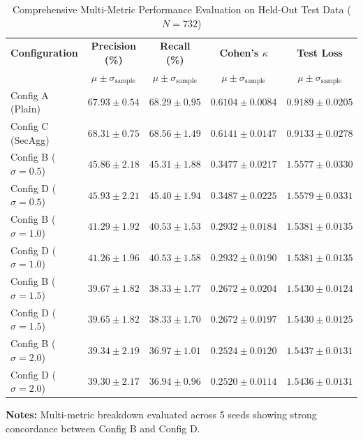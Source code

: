\documentclass[journal,twocolumn,10pt]{IEEEtran}
\begin{document}
\begin{table}[t]
\caption{Comprehensive Multi-Metric Performance Evaluation on Held-Out Test Data ($N = 732$)}
\label{tab:multi_metric}
\centering
\scriptsize
\begin{tabular}{lcccc}
\toprule
\textbf{Configuration} & \textbf{Precision (\%)} & \textbf{Recall (\%)} & \textbf{Cohen's $\kappa$} & \textbf{Test Loss} \\
& $\mu \pm \sigma_{\text{sample}}$ & $\mu \pm \sigma_{\text{sample}}$ & $\mu \pm \sigma_{\text{sample}}$ & $\mu \pm \sigma_{\text{sample}}$ \\
\midrule
Config A (Plain) & $67.93 \pm 0.54$ & $68.29 \pm 0.95$ & $0.6104 \pm 0.0084$ & $0.9189 \pm 0.0205$ \\
Config C (SecAgg) & $68.31 \pm 0.75$ & $68.56 \pm 1.49$ & $0.6141 \pm 0.0147$ & $0.9133 \pm 0.0278$ \\
Config B ($\sigma=0.5$) & $45.86 \pm 2.18$ & $45.31 \pm 1.88$ & $0.3477 \pm 0.0217$ & $1.5577 \pm 0.0330$ \\
Config D ($\sigma=0.5$) & $45.93 \pm 2.21$ & $45.40 \pm 1.94$ & $0.3487 \pm 0.0225$ & $1.5579 \pm 0.0331$ \\
Config B ($\sigma=1.0$) & $41.29 \pm 1.92$ & $40.53 \pm 1.53$ & $0.2932 \pm 0.0184$ & $1.5381 \pm 0.0135$ \\
Config D ($\sigma=1.0$) & $41.26 \pm 1.96$ & $40.53 \pm 1.58$ & $0.2932 \pm 0.0190$ & $1.5381 \pm 0.0135$ \\
Config B ($\sigma=1.5$) & $39.67 \pm 1.82$ & $38.33 \pm 1.77$ & $0.2672 \pm 0.0204$ & $1.5430 \pm 0.0124$ \\
Config D ($\sigma=1.5$) & $39.65 \pm 1.82$ & $38.33 \pm 1.70$ & $0.2672 \pm 0.0197$ & $1.5430 \pm 0.0125$ \\
Config B ($\sigma=2.0$) & $39.34 \pm 2.19$ & $36.97 \pm 1.01$ & $0.2524 \pm 0.0120$ & $1.5437 \pm 0.0131$ \\
Config D ($\sigma=2.0$) & $39.30 \pm 2.17$ & $36.94 \pm 0.96$ & $0.2520 \pm 0.0114$ & $1.5436 \pm 0.0131$ \\
\bottomrule
\end{tabular}
\vspace{1mm}
\begin{flushleft}
\scriptsize \textbf{Notes:} Multi-metric breakdown evaluated across 5 seeds showing strong concordance between Config B and Config D.
\end{flushleft}
\end{table}
\end{document}
